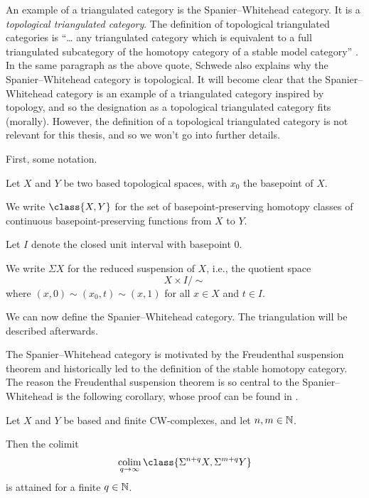 An example of a triangulated category is the Spanier--Whitehead category. It is a \emph{topological triangulated category}. The definition of topological triangulated categories is ``… any triangulated category which is equivalent to a full triangulated subcategory of the homotopy category of a stable model category'' \cite[p.\ 6]{Schwede_2010}. In the same paragraph as the above quote, Schwede also explains why the Spanier--Whitehead category is topological. It will become clear that the Spanier--Whitehead category is an example of a triangulated category inspired by topology, and so the designation as a topological triangulated category fits (morally). However, the definition of a topological triangulated category is not relevant for this thesis, and so we won't go into further details. 

First, some notation.
\begin{notation}
    Let \( X \) and \( Y \) be two based topological spaces, with \( x_0 \) the basepoint of \( X \).

    We write \( \class{ X, Y } \) for the set of basepoint-preserving homotopy classes of continuous basepoint-preserving functions from \( X \) to \( Y \).

    Let \( I \) denote the closed unit interval with basepoint \( 0 \).

    We write \( \Sigma X \) for the reduced suspension of \( X \), i.e., the quotient space
    \[
        X \times I / \sim
    \]
    where \( (x, 0) \sim (x_0, t) \sim (x, 1) \) for all \( x \in X \)  and \( t \in I \).
\end{notation}

We can now define the Spanier--Whitehead category. The triangulation will be described afterwards.

The Spanier--Whitehead category is motivated by the Freudenthal suspension theorem and historically led to the definition of the stable homotopy category. The reason the Freudenthal suspension theorem is so central to the Spanier--Whitehead is the following corollary, whose proof can be found in \cite[Remark 5.2]{Daria_Bachelor}.

\begin{corollary}
    \label{cor:sw_freudenthal_suspension}
    Let \( X \) and \( Y \) be based and finite CW-complexes, and let \( n, m \in {\mathbb{N}} \).
    
    Then the colimit
    \[
        \colim_{q \to \infty} \class{ \Sigma^{n + q} X, \Sigma^{m + q} Y }
    \]
    is attained for a finite \( q \in {\mathbb{N}} \).
\end{corollary}


